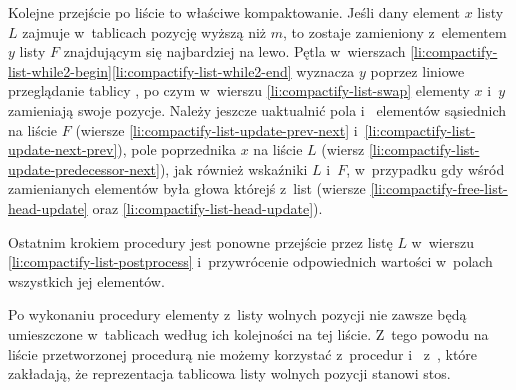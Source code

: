 Kolejne przejście po liście to właściwe kompaktowanie.
Jeśli dany element $x$ listy $L$ zajmuje w~tablicach pozycję wyższą niż $m$, to zostaje zamieniony z~elementem $y$ listy $F$ znajdującym się najbardziej na lewo.
Pętla  w~wierszach \ref{li:compactify-list-while2-begin}\nbendash\ref{li:compactify-list-while2-end} wyznacza $y$ poprzez liniowe przeglądanie tablicy , po czym w~wierszu \ref{li:compactify-list-swap} elementy $x$ i~$y$ zamieniają swoje pozycje.
Należy jeszcze uaktualnić pola  i~ elementów sąsiednich na liście $F$ (wiersze \ref{li:compactify-list-update-prev-next} i~\ref{li:compactify-list-update-next-prev}), pole  poprzednika $x$ na liście $L$ (wiersz \ref{li:compactify-list-update-predecessor-next}), jak również wskaźniki $L$ i~$F$, w~przypadku gdy wśród zamienianych elementów była głowa którejś z~list (wiersze \ref{li:compactify-free-list-head-update} oraz \ref{li:compactify-list-head-update}).

Ostatnim krokiem procedury jest ponowne przejście przez listę $L$ w~wierszu \ref{li:compactify-list-postprocess} i~przywrócenie odpowiednich wartości w~polach  wszystkich jej elementów.

Po wykonaniu procedury elementy z~listy wolnych pozycji nie zawsze będą umieszczone w~tablicach według ich kolejności na tej liście.
Z~tego powodu na liście przetworzonej procedurą  nie możemy korzystać z~procedur  i~ z~, które zakładają, że reprezentacja tablicowa listy wolnych pozycji stanowi stos.
